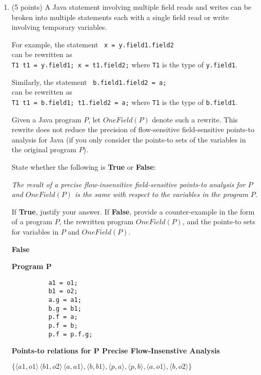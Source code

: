 \documentclass[12pt]{article}
\begin{document}
\begin{enumerate}
  \newpage
  \item (5 points) A Java statement involving multiple field reads and writes can be broken into
  multiple statements each with a single field read or write involving temporary variables.

  For example, the statement \lstinline$ x = y.field1.field2$ \\
  can be rewritten as \\ 
  \lstinline$T1 t1 = y.field1; x = t1.field2;$ where
  \lstinline$T1$ is the type of \lstinline$y.field1$.

  Similarly, the statement \lstinline$ b.field1.field2 = a;$ \\
  can  be rewritten as \\ 
  \lstinline$T1 t1 = b.field1; t1.field2 = a;$ where
  \lstinline$T1$ is the type of \lstinline$b.field1$.

  Given a Java program $P$, let $OneField(P)$ denote such a rewrite.
  This rewrite does not reduce the precision of flow-sensitive field-sensitive points-to analysis for Java
  (if you only consider the points-to sets of the variables in the original program $P$).
  
  State whether the following is \textbf{True} or \textbf{False}:

  \emph{The result of a precise flow-insensitive field-sensitive points-to analysis 
  for $P$ and $OneField(P)$ is the same with respect to the variables in 
  the program $P$.}

  If \textbf{True}, justify your answer.
  If \textbf{False}, provide a counter-example in the form of a program $P$,
  the rewritten program $OneField(P)$, and the points-to sets for variables
  in $P$ and $OneField(P)$.
    
  \begin{mdframed}
    \textbf{False}

    \textbf{Program P}
        \begin{lstlisting}
          a1 = o1;
          b1 = o2;
          a.g = a1;
          b.g = b1;
          p.f = a;
          p.f = b;
          p.f = p.f.g;
        \end{lstlisting}
        \textbf{Points-to relations for P Precise Flow-Insenstive Analysis}

        $\{\langle a1, o1 \rangle\, \langle b1, o2 \rangle\, \langle a, a1 \rangle, \langle b, b1 \rangle, \langle p, a \rangle, \langle p, b \rangle, \langle a, o1 \rangle, \langle b, o2 \rangle \}$


\end{mdframed}
\end{enumerate}
\end{document}

